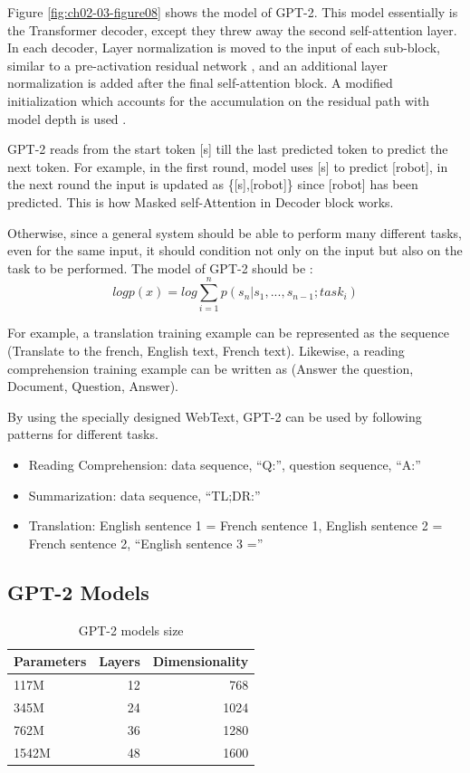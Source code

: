\documentclass[]{krantz}
\begin{document}
Figure \ref{fig:ch02-03-figure08} shows the model of GPT-2. This model essentially is the Transformer decoder, except they threw away the second self-attention layer. In each decoder, Layer normalization \citet{ba2016layer} is moved to the input of each sub-block, similar to a pre-activation residual network \citet{he2016identity}, and an additional layer normalization is added after the final self-attention block. A modified initialization which accounts for the accumulation on the residual path with model depth is used \citet{radford2019gpt2}.

GPT-2 reads from the start token {[}s{]} till the last predicted token to predict the next token. For example, in the first round, model uses {[}s{]} to predict {[}robot{]}, in the next round the input is updated as \{{[}s{]},{[}robot{]}\} since {[}robot{]} has been predicted. This is how Masked self-Attention in Decoder block works.

Otherwise, since a general system should be able to perform many different tasks, even for the same input, it should condition not only on the input but also on the task to be performed.
The model of GPT-2 should be :
\[log p(x)=log\sum^{n}_{i=1}p(s_n|s_1,...,s_{n-1};task_i)\]

For example, a translation training example can be represented as the sequence (Translate to the french, English text, French text). Likewise, a reading comprehension training example can be written as (Answer the question, Document, Question, Answer).

By using the specially designed WebText, GPT-2 can be used by following patterns for different tasks.

\begin{itemize}
\item
  Reading Comprehension: data sequence, ``Q:'', question sequence, ``A:''
\item
  Summarization: data sequence, ``TL;DR:''
\item
  Translation: English sentence 1 = French sentence 1, English sentence 2 = French sentence 2, ``English sentence 3 =''
\end{itemize}

\hypertarget{gpt-2-models}{%
\subsection{GPT-2 Models}\label{gpt-2-models}}

\begin{table}

\caption{\label{tab:ch02-03-table01}GPT-2 models size}
\centering
\begin{tabular}[t]{l|r|r}
\hline
Parameters & Layers & Dimensionality\\
\hline
117M & 12 & 768\\
\hline
345M & 24 & 1024\\
\hline
762M & 36 & 1280\\
\hline
1542M & 48 & 1600\\
\hline
\end{tabular}
\end{table}
\end{document}
